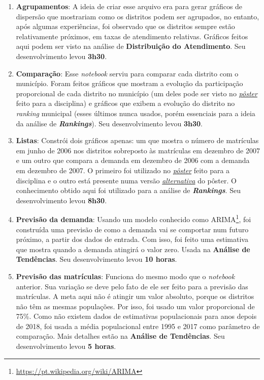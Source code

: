 \documentclass[12pt, a4paper]{article}
\begin{document}
\begin{enumerate}
	\item \textbf{Agrupamentos}: A ideia de criar esse arquivo era para gerar gráficos de dispersão que mostrariam como os distritos podem ser agrupados, no entanto, após algumas experiências, foi observado que os distritos sempre estão relativamente próximos, em taxas de atendimento relativas. Gráficos feitos aqui podem ser visto na análise de \textbf{Distribuição do Atendimento}. Seu desenvolvimento levou \textbf{3h30}.
	\item \textbf{Comparação}: Esse \textit{notebook} serviu para comparar cada distrito com o município. Foram feitos gráficos que mostram a evolução da participação proporcional de cada distrito no município (um deles pode ser visto no \href{https://lsflp.github.io/MAC0213/poster/poster_a1.pdf}{\textit{pôster}} feito para a disciplina) e gráficos que exibem a evolução do distrito no \textit{ranking} municipal (esses últimos nunca usados, porém essenciais para a ideia da análise de \textbf{\textit{Rankings}}). Seu desenvolvimento levou \textbf{3h30}.
	\item \textbf{Listas}: Constrói dois gráficos apenas: um que mostra o número de matrículas em junho de 2006 nos distritos sobreposto às matrículas em dezembro de 2007 e um outro que compara a demanda em dezembro de 2006 com a demanda em dezembro de 2007. O primeiro foi utilizado no \href{https://lsflp.github.io/MAC0213/poster/poster_a1.pdf}{\textit{pôster}} feito para a disciplina e o outro está presente numa versão \href{https://lsflp.github.io/MAC0213/poster/poster_a0.pdf}{\textit{alternativa}} do pôster. O conhecimento obtido aqui foi utilizado para a análise de \textbf{\textit{Rankings}}. Seu desenvolvimento levou \textbf{8h30}.
	\item \textbf{Previsão da demanda}: Usando um modelo conhecido como ARIMA\footnote{\url{https://pt.wikipedia.org/wiki/ARIMA}}, foi construída uma previsão de como a demanda vai se comportar num futuro próximo, a partir dos dados de entrada. Com isso, foi feito uma estimativa que mostra quando a demanda atingirá o valor zero. Usada na \textbf{Análise de Tendências}. Seu desenvolvimento levou \textbf{10 horas}.
	\item \textbf{Previsão das matrículas}: Funciona do mesmo modo que o \textit{notebook} anterior. Sua variação se deve pelo fato de ele ser feito para a previsão das matrículas. A meta aqui não é atingir um valor absoluto, porque os distritos não têm as mesmas populações. Por isso, foi usado um valor proporcional de 75\%. Como não existem dados de estimativas populacionais para anos depois de 2018, foi usada a média populacional entre 1995 e 2017 como parâmetro de comparação. Mais detalhes estão na \textbf{Análise de Tendências}. Seu desenvolvimento levou \textbf{5 horas}.

\end{enumerate}
\end{document}
